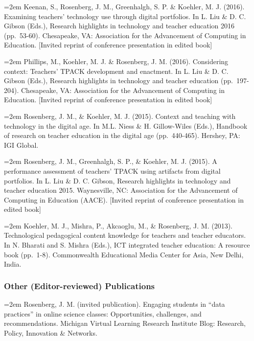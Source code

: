 \documentclass[]{article}
\begin{document}
\hangindent=2em Keenan, S., Rosenberg, J. M., Greenhalgh, S. P. \&
Koehler, M. J. (2016). Examining teachers' technology use through
digital portfolios. In L. Liu \& D. C. Gibson (Eds.), Research
highlights in technology and teacher education 2016 (pp.~53-60).
Chesapeake, VA: Association for the Advancement of Computing in
Education. {[}Invited reprint of conference presentation in edited
book{]}

\hangindent=2em Phillips, M., Koehler, M. J. \& Rosenberg, J. M. (2016).
Considering context: Teachers' TPACK development and enactment. In L.
Liu \& D. C. Gibson (Eds.), Research highlights in technology and
teacher education (pp.~197-204). Chesapeake, VA: Association for the
Advancement of Computing in Education. {[}Invited reprint of conference
presentation in edited book{]}

\hangindent=2em Rosenberg, J. M., \& Koehler, M. J. (2015). Context and
teaching with technology in the digital age. In M.L. Niess \& H.
Gillow-Wiles (Eds.), Handbook of research on teacher education in the
digital age (pp.~440-465). Hershey, PA: IGI Global.

\hangindent=2em Rosenberg, J. M., Greenhalgh, S. P., \& Koehler, M. J.
(2015). A performance assessment of teachers' TPACK using artifacts from
digital portfolios. In L. Liu \& D. C. Gibson, Research highlights in
technology and teacher education 2015. Waynesville, NC: Association for
the Advancement of Computing in Education (AACE). {[}Invited reprint of
conference presentation in edited book{]}

\hangindent=2em Koehler, M. J., Mishra, P., Akcaoglu, M., \& Rosenberg,
J. M. (2013). Technological pedagogical content knowledge for teachers
and teacher educators. In N. Bharati and S. Mishra (Eds.), ICT
integrated teacher education: A resource book (pp.~1-8). Commonwealth
Educational Media Center for Asia, New Delhi, India.

\hypertarget{other-editor-reviewed-publications}{%
\subsubsection{Other (Editor-reviewed)
Publications}\label{other-editor-reviewed-publications}}

\hangindent=2em Rosenberg, J. M. (invited publication). Engaging
students in ``data practices'' in online science classes: Opportunities,
challenges, and recommendations. Michigan Virtual Learning Research
Institute Blog: Research, Policy, Innovation \& Networks.
\end{document}
